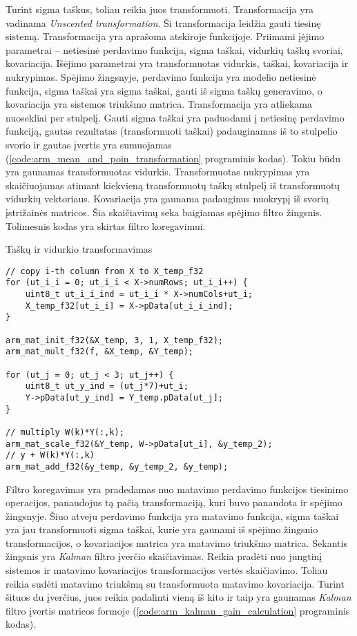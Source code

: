 Turint sigma taškus, toliau reikia juos transformuoti.
Transformacija \cite{julier2002scaled} yra vadinama \textit{Unscented transformation}.
Ši transformacija leidžia gauti tiesinę sistemą.
Transformacija yra aprašoma atskiroje funkcijoje.
Priimami įėjimo parametrai -- netiesinė perdavimo funkcija, sigma taškai, vidurkių taškų svoriai, kovariacija.
Išėjimo parametrai yra transformuotas vidurkis, taškai, kovariacija ir nukrypimas.
Spėjimo žingsnyje, perdavimo funkcija yra modelio netiesinė funkcija, sigma taškai yra sigma taškai, gauti iš sigma taškų generavimo, o kovariacija yra sistemos triukšmo matrica.
Transformacija yra atliekama nuosekliai per stulpelį.
Gauti sigma taškai yra paduodami į netiesinę perdavimo funkciją, gautas rezultatas (transformuoti taškai) padauginamas iš to stulpelio svorio ir gautas įvertis yra sumuojamas (\ref{code:arm_mean_and_poin_transformation} programinis kodas).
Tokiu būdu yra gaunamas transformuotas vidurkis.
Transformuotas nukrypimas yra skaičiuojamas atimant kiekvieną transformuotų taškų stulpelį iš transformuotų vidurkių vektoriaus.
Kovariacija yra gaunama padauginus nuokrypį iš svorių įstrižainės matricos. Šia skaičiavimų seka baigiamas spėjimo filtro žingsnis.
Tolimesnis kodas yra skirtas filtro koregavimui.

\begin{cfigure}
    \centering
    \caption{Taškų ir vidurkio transformavimas}
    \label{code:arm_mean_and_poin_transformation}
    \begin{lstlisting}
// copy i-th column from X to X_temp_f32
for (ut_i_i = 0; ut_i_i < X->numRows; ut_i_i++) {
    uint8_t ut_i_i_ind = ut_i_i * X->numCols+ut_i;
    X_temp_f32[ut_i_i] = X->pData[ut_i_i_ind];
}

arm_mat_init_f32(&X_temp, 3, 1, X_temp_f32);
arm_mat_mult_f32(f, &X_temp, &Y_temp);

for (ut_j = 0; ut_j < 3; ut_j++) {
    uint8_t ut_y_ind = (ut_j*7)+ut_i;
    Y->pData[ut_y_ind] = Y_temp.pData[ut_j];
}

// multiply W(k)*Y(:,k);
arm_mat_scale_f32(&Y_temp, W->pData[ut_i], &y_temp_2);
// y + W(k)*Y(:,k)
arm_mat_add_f32(&y_temp, &y_temp_2, &y_temp);
    \end{lstlisting}
\end{cfigure}

Filtro koregavimas yra pradedamas nuo matavimo perdavimo funkcijos tiesinimo operacijos, panaudojus tą pačią transformaciją, kuri buvo panaudota ir spėjimo žingsnyje.
Šiuo atveju perdavimo funkcija yra matavimo funkcija, sigma taškai yra jau transformuoti sigma taškai, kurie yra gaunami iš spėjimo žingsnio transformacijos, o kovariacijos matrica yra matavimo triukšmo matrica.
Sekantis žingsnis yra \textit{Kalman} filtro įverčio skaičiavimas.
Reikia pradėti nuo jungtinį sistemos ir matavimo kovariacijos transformacijos vertės skaičiavimo.
Toliau reikia sudėti matavimo triukšmą su transformuota matavimo kovariacija.
Turint šituos du įverčius, juos reikia padalinti vieną iš kito ir taip yra gaunamas \textit{Kalman} filtro įvertis matricos formoje (\ref{code:arm_kalman_gain_calculation} programinis kodas).

